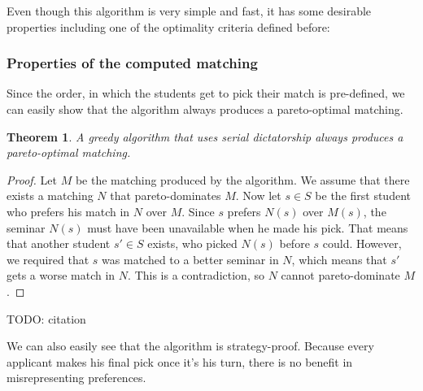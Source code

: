 Even though this algorithm is very simple and fast, it has some desirable properties including one of the optimality criteria defined before:

\subsubsection{Properties of the computed matching}
Since the order, in which the students get to pick their match is pre-defined, we can easily show that the algorithm always produces a pareto-optimal matching.
\newtheorem{theorem}{Theorem}
\begin{theorem}
    A greedy algorithm that uses serial dictatorship always produces a pareto-optimal matching.
\end{theorem}
\begin{proof}
    Let $M$ be the matching produced by the algorithm. We assume that there exists a matching $N$ that pareto-dominates $M$. Now let $s\in S$ be the first student who prefers his match in $N$ over $M$. Since $s$ prefers $N(s)$ over $M(s)$, the seminar $N(s)$ must have been unavailable when he made his pick. That means that another student $s' \in S$ exists, who picked $N(s)$ before $s$ could. However, we required that $s$ was matched to a better seminar in $N$, which means that $s'$ gets a worse match in $N$. This is a contradiction, so $N$ cannot pareto-dominate $M$.
\end{proof} TODO: citation

We can also easily see that the algorithm is strategy-proof. \cite{Klaus} Because every applicant makes his final pick once it's his turn, there is no benefit in misrepresenting preferences.

